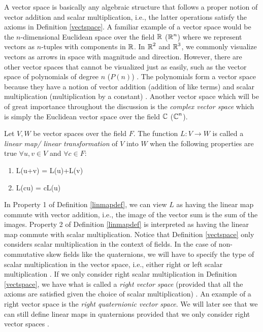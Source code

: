 A vector space is basically any algebraic structure that follows a proper notion of vector addition and scalar multiplication, i.e., the latter operations satisfy the axioms in Definition \ref{vectspace}. A familiar example of a vector space would be the $n$-dimensional Euclidean space over the field $\operatorname{\mathbb{R}}$ ($\operatorname{\mathbb{R}}^n$) where we represent vectors as $n$-tuples with components in $\operatorname{\mathbb{R}}$. In $\operatorname{\mathbb{R}}^2$ and $\operatorname{\mathbb{R}}^3$, we commonly visualize vectors as arrows in space with magnitude and direction. However, there are other vector spaces that cannot be visualized just as easily, such as the vector space of polynomials of degree $n$ ($P(n)$) \cite{3b1b} \cite{larson}. The polynomials form a vector space because they have a notion of vector addition (addition of like terms) and scalar multiplication (multiplication by a constant) \cite{3b1b} \cite{larson}. Another vector space which will be of great importance throughout the discussion is the \emph{complex vector space} which is simply the Euclidean vector space over the field $\operatorname{\mathbb{C}}$ ($\operatorname{\mathbb{C}}^n$).

\begin{definition} \label{linmapdef}
	\cite{larson}Let $V, W$ be vector spaces over the field $F$. The function $L: V \rightarrow W$ is called a \emph{linear map/ linear transformation} of $V$ into $W$ when the following properties are true $\forall u,v \in V$ and $\forall c \in F$:
	\begin{enumerate}
		\item L(u+v) = L(u)+L(v)
		\item L(cu) = cL(u)
	\end{enumerate}
\end{definition}

 In Property 1 of Definition \ref{linmapdef}, we can view $L$ as having the linear map commute with vector addition, i.e., the image of the vector sum is the sum of the images. Property 2 of Definition \ref{linmapdef} is interpreted as having the linear map commute with scalar multiplication. Notice that Definition \ref{vectspace} only considers scalar multiplication in the context of fields. In the case of non-commutative skew fields like the quaternions, we will have to specify the type of scalar multiplication in the vector space, i.e., either right or left scalar multiplication \cite{stack}. If we only consider right scalar multiplication in Definition \ref{vectspace}, we have what is called a \emph{right vector space} (provided that all the axioms are satisfied given the choice of scalar multiplication) \cite{stack}. An example of a right vector space is the \emph{right quaternionic vector space}. We will later see that we can still define linear maps in quaternions provided that we only consider right vector spaces \cite{stack} \cite{aslaksen}.

